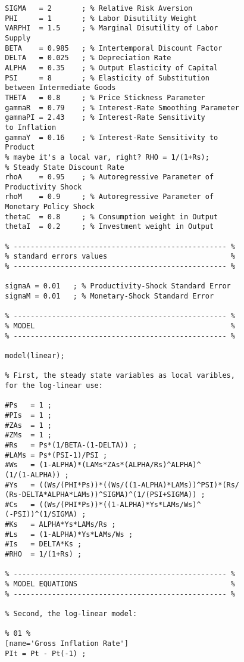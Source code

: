 \documentclass[
thesis.tex
]{subfiles}
\begin{document}
{\begin{verbatim}
		SIGMA   = 2       ; % Relative Risk Aversion
		PHI     = 1       ; % Labor Disutility Weight
		VARPHI  = 1.5     ; % Marginal Disutility of Labor 
		Supply
		BETA    = 0.985   ; % Intertemporal Discount Factor
		DELTA   = 0.025   ; % Depreciation Rate
		ALPHA   = 0.35    ; % Output Elasticity of Capital
		PSI     = 8       ; % Elasticity of Substitution 
		between Intermediate Goods
		THETA   = 0.8     ; % Price Stickness Parameter
		gammaR  = 0.79    ; % Interest-Rate Smoothing Parameter
		gammaPI = 2.43    ; % Interest-Rate Sensitivity 
		to Inflation
		gammaY  = 0.16    ; % Interest-Rate Sensitivity to 
		Product
		% maybe it's a local var, right? RHO = 1/(1+Rs); 
		% Steady State Discount Rate
		rhoA    = 0.95    ; % Autoregressive Parameter of 
		Productivity Shock
		rhoM    = 0.9     ; % Autoregressive Parameter of 
		Monetary Policy Shock
		thetaC  = 0.8     ; % Consumption weight in Output
		thetaI  = 0.2     ; % Investment weight in Output
		
		% -------------------------------------------------- % 
		% standard errors values                             %
		% -------------------------------------------------- %
		
		sigmaA = 0.01   ; % Productivity-Shock Standard Error
		sigmaM = 0.01   ; % Monetary-Shock Standard Error
		
		% -------------------------------------------------- %
		% MODEL                                              %
		% -------------------------------------------------- %
		
		model(linear);
		
		% First, the steady state variables as local varibles, 
		for the log-linear use:
		
		#Ps   = 1 ;
		#PIs  = 1 ;
		#ZAs  = 1 ;
		#ZMs  = 1 ;
		#Rs   = Ps*(1/BETA-(1-DELTA)) ;
		#LAMs = Ps*(PSI-1)/PSI ;
		#Ws   = (1-ALPHA)*(LAMs*ZAs*(ALPHA/Rs)^ALPHA)^
		(1/(1-ALPHA)) ;
		#Ys   = ((Ws/(PHI*Ps))*((Ws/((1-ALPHA)*LAMs))^PSI)*(Rs/
		(Rs-DELTA*ALPHA*LAMs))^SIGMA)^(1/(PSI+SIGMA)) ;
		#Cs   = ((Ws/(PHI*Ps))*((1-ALPHA)*Ys*LAMs/Ws)^
		(-PSI))^(1/SIGMA) ;
		#Ks   = ALPHA*Ys*LAMs/Rs ;
		#Ls   = (1-ALPHA)*Ys*LAMs/Ws ;
		#Is   = DELTA*Ks ;
		#RHO  = 1/(1+Rs) ;
		
		% -------------------------------------------------- % 
		% MODEL EQUATIONS                                    %
		% -------------------------------------------------- %
		
		% Second, the log-linear model:
		
		% 01 %
		[name='Gross Inflation Rate']
		PIt = Pt - Pt(-1) ;
		

\end{verbatim}}
\end{document}
